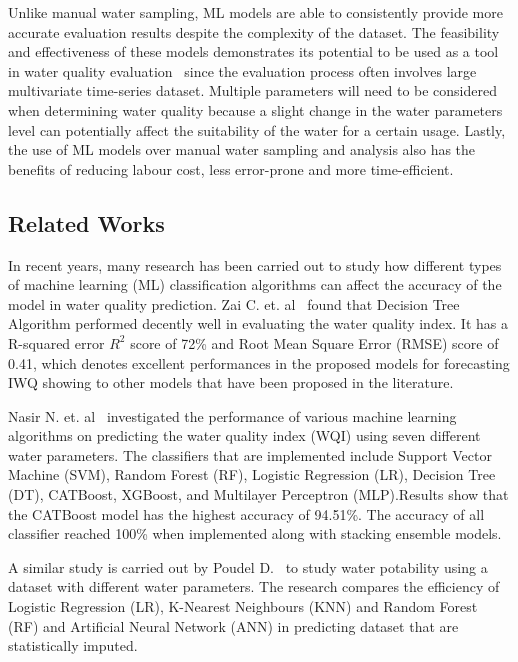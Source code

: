 \documentclass[conference]{IEEEtran}
\begin{document}
Unlike manual water sampling, ML models are able to consistently provide more accurate evaluation results despite the complexity of the dataset. The feasibility and effectiveness of these models demonstrates its potential to be used as a tool in water quality evaluation~\cite{zhu2022review} since the evaluation process often involves large multivariate time-series dataset. Multiple parameters will need to be considered when determining water quality because a slight change in the water parameters level can potentially affect the suitability of the water for a certain usage. Lastly, the use of ML models over manual water sampling and analysis also has the benefits of reducing labour cost, less error-prone and more time-efficient.

\subsection{Related Works}
In recent years, many research has been carried out to study how different types of machine learning (ML) classification algorithms can affect the accuracy of the model in water quality prediction. Zai C. et. al~\cite{zai2022prediction} found that Decision Tree Algorithm performed decently well in evaluating the water quality index. It has a R-squared error $ R^{2}$ score of 72\% and Root Mean Square Error (RMSE) score of 0.41, which denotes excellent performances in the proposed models for forecasting IWQ showing to other models that have been proposed in the literature. 

Nasir N. et. al~\cite{nasir2022water} investigated the performance of various machine learning algorithms on predicting the water quality index (WQI) using seven different water parameters. The classifiers that are implemented include Support Vector Machine (SVM), Random Forest (RF), Logistic Regression (LR), Decision Tree (DT), CATBoost, XGBoost, and Multilayer Perceptron (MLP).Results show that the CATBoost model has the highest accuracy of 94.51\%. The accuracy of all classifier reached 100\% when implemented along with stacking ensemble models.
    
A similar study is carried out by Poudel D.~\cite{poudelcomparison} to study water potability using a dataset with different water parameters. The research compares the efficiency of Logistic Regression (LR), K-Nearest Neighbours (KNN) and Random Forest (RF) and Artificial Neural Network (ANN) in predicting dataset that are statistically imputed. 
\end{document}
